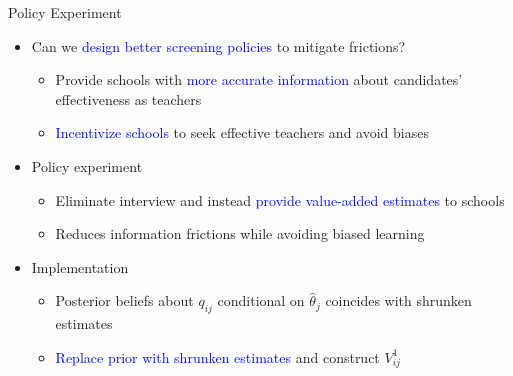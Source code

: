 \documentclass[compress,10pt,aspectratio=169]{beamer}
\newcommand\emphblue[1]{\textcolor{blue}{#1}}
\begin{document}
\begin{frame}{Policy Experiment}
\begin{itemize}
    \item Can we \emphblue{design better screening policies} to mitigate frictions?
    \begin{itemize}
    \smallskip
        \item[$\Rightarrow$] Provide schools with \emphblue{more accurate information} about candidates' effectiveness as teachers
        \medskip
        \item[$\Rightarrow$] \emphblue{Incentivize schools} to seek effective teachers and avoid biases
    \end{itemize}
    \bigskip
    \item Policy experiment
    \begin{itemize}
    \smallskip
        \item[$\Rightarrow$] Eliminate interview and instead \emphblue{provide value-added estimates} to schools
        \medskip
        \item[$\Rightarrow$] Reduces information frictions while avoiding biased learning
    \end{itemize}
    \bigskip
    \item Implementation
    \begin{itemize}
    \smallskip
        \item[$\Rightarrow$] Posterior beliefs about $q_{ij}$ conditional on $\hat{\theta}_j$ coincides with shrunken estimates
        \medskip
        \item[$\Rightarrow$] \emphblue{Replace prior with shrunken estimates} and construct $V^1_{ij}$
    \end{itemize}
\end{itemize}
\end{frame}
\end{document}
